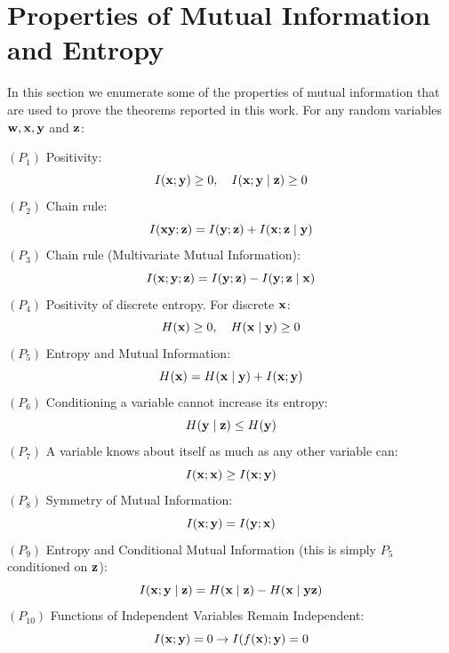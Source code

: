\section{Properties of Mutual Information and Entropy}
\label{app:properties}

In this section we enumerate some of the properties of mutual information that are used to prove the theorems reported in this work. For any random variables ${\mathbf{w}}, {\mathbf{x}}, {\mathbf{y}}$ and ${\mathbf{z}}$:

$\left(P_1\right)$ Positivity:
\begin{equation*} I({\mathbf{x}} ; {\mathbf{y}}) \geq 0, \quad I({\mathbf{x}} ; {\mathbf{y}} \mid {\mathbf{z}}) \geq 0 \end{equation*}
$\left(P_2\right)$ Chain rule:
\begin{equation*} I({\mathbf{x}} {\mathbf{y}} ; {\mathbf{z}})=I({\mathbf{y}} ; {\mathbf{z}})+I({\mathbf{x}} ; {\mathbf{z}} \mid {\mathbf{y}}) \end{equation*}
$\left(P_3\right)$ Chain rule (Multivariate Mutual Information):
\begin{equation*} I({\mathbf{x}} ; {\mathbf{y}} ; {\mathbf{z}})=I({\mathbf{y}} ; {\mathbf{z}})-I({\mathbf{y}} ; {\mathbf{z}} \mid {\mathbf{x}}) \end{equation*}
$\left(P_4\right)$ Positivity of discrete entropy. For discrete ${\mathbf{x}}$:
\begin{equation*} H({\mathbf{x}}) \geq 0, \quad H({\mathbf{x}} \mid {\mathbf{y}}) \geq 0 \end{equation*}
$\left(P_5\right)$ Entropy and Mutual Information:
\begin{equation*} H({\mathbf{x}})=H({\mathbf{x}} \mid {\mathbf{y}})+I({\mathbf{x}} ; {\mathbf{y}}) \end{equation*}
$(P_6)$ Conditioning a variable cannot increase its entropy:
\begin{equation*} H({\mathbf{y}} \mid {\mathbf{z}}) \leq H({\mathbf{y}}) \end{equation*}
$(P_7)$ A variable knows about itself as much as any other variable can:
\begin{equation*} I({\mathbf{x}} ; {\mathbf{x}}) \geq I({\mathbf{x}} ; {\mathbf{y}}) \end{equation*}
$(P_8)$ Symmetry of Mutual Information:
\begin{equation*} I({\mathbf{x}} ; {\mathbf{y}}) = I({\mathbf{y}} ; {\mathbf{x}}) \end{equation*}
$(P_9)$ Entropy and Conditional Mutual Information (this is simply $P_5$ conditioned on ${\mathbf{z}}$):
\begin{equation*} I({\mathbf{x}} ; {\mathbf{y}} \mid {\mathbf{z}}) = H({\mathbf{x}} \mid {\mathbf{z}}) - H({\mathbf{x}} \mid {\mathbf{y}} {\mathbf{z}}) \end{equation*}
$(P_{10})$ Functions of Independent Variables Remain Independent:
\begin{equation*} I({\mathbf{x}} ; {\mathbf{y}}) = 0 \rightarrow I(f({\mathbf{x}}) ; {\mathbf{y}}) = 0 \end{equation*}

